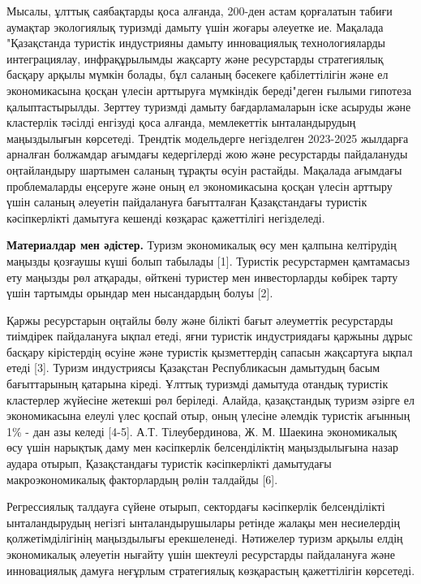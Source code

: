 Мысалы, ұлттық саябақтарды қоса алғанда, 200-ден астам қорғалатын табиғи
аумақтар экологиялық туризмді дамыту үшін жоғары әлеуетке ие. Мақалада
"Қазақстанда туристік индустрияны дамыту инновациялық технологияларды
интеграциялау, инфрақұрылымды жақсарту және ресурстарды стратегиялық
басқару арқылы мүмкін болады, бұл саланың бәсекеге қабілеттілігін және
ел экономикасына қосқан үлесін арттыруға мүмкіндік береді"деген ғылыми
гипотеза қалыптастырылды. Зерттеу туризмді дамыту бағдарламаларын іске
асыруды және кластерлік тәсілді енгізуді қоса алғанда, мемлекеттік
ынталандырудың маңыздылығын көрсетеді. Трендтік модельдерге негізделген
2023-2025 жылдарға арналған болжамдар ағымдағы кедергілерді жою және
ресурстарды пайдалануды оңтайландыру шартымен саланың тұрақты өсуін
растайды. Мақалада ағымдағы проблемаларды еңсеруге және оның ел
экономикасына қосқан үлесін арттыру үшін саланың әлеуетін пайдалануға
бағытталған Қазақстандағы туристік кәсіпкерлікті дамытуға кешенді
көзқарас қажеттілігі негізделеді.

{\bfseries Материалдар мен әдістер.} Туризм экономикалық өсу мен қалпына
келтірудің маңызды қозғаушы күші болып табылады {[}1{]}. Туристік
ресурстармен қамтамасыз ету маңызды рөл атқарады, өйткені туристер мен
инвесторларды көбірек тарту үшін тартымды орындар мен нысандардың болуы
{[}2{]}.

Қаржы ресурстарын оңтайлы бөлу және білікті бағыт әлеуметтік ресурстарды
тиімдірек пайдалануға ықпал етеді, яғни туристік индустриядағы қаржыны
дұрыс басқару кірістердің өсуіне және туристік қызметтердің сапасын
жақсартуға ықпал етеді {[}3{]}. Туризм индустриясы Қазақстан
Республикасын дамытудың басым бағыттарының қатарына кіреді. Ұлттық
туризмді дамытуда отандық туристік кластерлер жүйесіне жетекші рөл
беріледі. Алайда, қазақстандық туризм әзірге ел экономикасына елеулі
үлес қоспай отыр, оның үлесіне әлемдік туристік ағынның 1\% - дан азы
келеді {[}4-5{]}. А.Т. Тілеубердинова, Ж. М. Шаекина экономикалық өсу
үшін нарықтық даму мен кәсіпкерлік белсенділіктің маңыздылығына назар
аудара отырып, Қазақстандағы туристік кәсіпкерлікті дамытудағы
макроэкономикалық факторлардың рөлін талдайды {[}6{]}.

Регрессиялық талдауға сүйене отырып, сектордағы кәсіпкерлік
белсенділікті ынталандырудың негізгі ынталандырушылары ретінде жалақы
мен несиелердің қолжетімділігінің маңыздылығы ерекшеленеді. Нәтижелер
туризм арқылы елдің экономикалық әлеуетін нығайту үшін шектеулі
ресурстарды пайдалануға және инновациялық дамуға неғұрлым стратегиялық
көзқарастың қажеттілігін көрсетеді.

